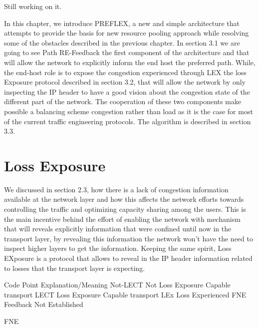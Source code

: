 
Still working on it.


In this chapter, we introduce PREFLEX, a new and simple architecture that attempts to provide the basis for new resource pooling approach while resolving some of the obstacles described in the previous chapter. In section 3.1 we are going to see Path RE-Feedback the first component of the architecture and that will allow the network to explicitly inform the end host the preferred path.  While, the end-host role is to expose the congestion experienced through LEX the loss Exposure protocol described in section 3.2, that will allow the network by only inspecting the IP header to have a good vision about the congestion state of the different part of the network. The cooperation of these two components make possible a balancing scheme congestion rather than load as it is the case for most of the current traffic engineering protocols. The algorithm is described in section 3.3.

\section{Loss Exposure}

We discussed in section 2.3, how there is a lack of congestion information available at the network layer and how this affects the network efforts towards controlling the traffic and optimizing capacity sharing among the users. This is the main incentive behind the effort of enabling the network with mechanism that will reveals explicitly information that were confined until now in the transport layer, by revealing this information the network won't have the need to inspect higher layers to get the information. Keeping the same spirit, Loss EXposure is a protocol that allows to reveal in the IP header information related to losses that the transport layer is expecting.


Code Point
Explanation/Meaning
Not-LECT
Not Loss Exposure Capable transport
LECT
Loss Exposure Capable transport
LEx
Loss Experienced
FNE
Feedback Not Established


FNE 


